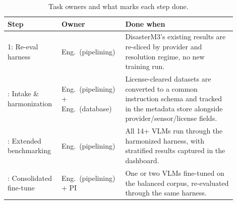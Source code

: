 \begin{table}[t]
\centering
\caption{Task owners and what marks each step done.}
\label{tab:research-tasks}
\begin{tabular}{@{}p{0.20\linewidth}p{0.24\linewidth}p{0.46\linewidth}@{}}
\toprule
\textbf{Step} & \textbf{Owner} & \textbf{Done when} \\
\midrule
1: Re-eval harness &
Eng.\ (pipelining) &
DisasterM3's existing results are re-sliced by provider and resolution regime, no new training run. \\
\addlinespace
2: Intake \& harmonization &
Eng.\ (pipelining) + Eng.\ (database) &
License-cleared datasets are converted to a common instruction schema and tracked in the metadata store alongside provider/sensor/license fields. \\
\addlinespace
3: Extended benchmarking &
Eng.\ (pipelining) &
All 14+ VLMs run through the harmonized harness, with stratified results captured in the dashboard. \\
\addlinespace
4: Consolidated fine-tune &
Eng.\ (pipelining) + PI &
One or two VLMs fine-tuned on the balanced corpus, re-evaluated through the same harness. \\
\bottomrule
\end{tabular}
\end{table}